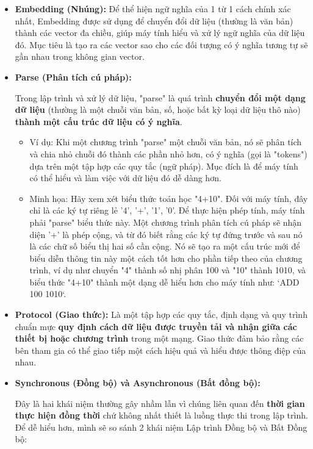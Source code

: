 \documentclass[11pt]{article}
\begin{document}
\begin{itemize}
	\item \textbf{Embedding (Nhúng):} \label{app:embedding} Để thể hiện ngữ nghĩa của 1 từ 1 cách chính xác nhất, Embedding được sử dụng để chuyển đổi dữ liệu (thường là văn bản) thành các vector đa chiều, giúp máy tính hiểu và xử lý ngữ nghĩa của dữ liệu đó. Mục tiêu là tạo ra các vector sao cho các đối tượng có ý nghĩa tương tự sẽ gần nhau trong không gian vector.

    \item \textbf{Parse (Phân tích cú pháp):} \label{app:parse}
    \begin{boxC}
        Trong lập trình và xử lý dữ liệu, "parse" là quá trình \textbf{chuyển đổi một dạng dữ liệu} (thường là một chuỗi văn bản, số, hoặc bất kỳ loại dữ liệu thô nào) \textbf{thành một cấu trúc dữ liệu có ý nghĩa}.
        \begin{itemize}
            \item Ví dụ: Khi một chương trình "parse" một chuỗi văn bản, nó sẽ phân tích và chia nhỏ chuỗi đó thành các phần nhỏ hơn, có ý nghĩa (gọi là "tokens") dựa trên một tập hợp các quy tắc (ngữ pháp). Mục đích là để máy tính có thể hiểu và làm việc với dữ liệu đó dễ dàng hơn.
            \item Minh họa: Hãy xem xét biểu thức toán học "4+10". Đối với máy tính, đây chỉ là các ký tự riêng lẻ '4', '+', '1', '0'. Để thực hiện phép tính, máy tính phải "parse" biểu thức này. Một chương trình phân tích cú pháp sẽ nhận diện '+' là phép cộng, và từ đó biết rằng các ký tự đứng trước và sau nó là các chữ số biểu thị hai số cần cộng. Nó sẽ tạo ra một cấu trúc mới để biểu diễn thông tin này một cách tốt hơn cho phần tiếp theo của chương trình, ví dụ như chuyển "4" thành số nhị phân 100 và "10" thành 1010, và biểu thức "4+10" thành một dạng dễ hiểu hơn cho máy tính như: `ADD 100 1010`.
        \end{itemize}
    \end{boxC}

    \item \textbf{Protocol (Giao thức):} \label{app:protocol} Là một tập hợp các quy tắc, định dạng và quy trình chuẩn mực \textbf{quy định cách dữ liệu được truyền tải và nhận giữa các thiết bị hoặc chương trình} trong một mạng. Giao thức đảm bảo rằng các bên tham gia có thể giao tiếp một cách hiệu quả và hiểu được thông điệp của nhau.

    \item \textbf{Synchronous (Đồng bộ) và Asynchronous (Bất đồng bộ):} \label{app:synchronous_asynchronous}
    \begin{boxC}
        Đây là hai khái niệm thường gây nhầm lẫn vì chúng liên quan đến \textbf{thời gian thực hiện đồng thời} chứ không nhất thiết là luồng thực thi trong lập trình. Để dễ hiểu hơn, mình sẽ so sánh 2 khái niệm Lập trình Đồng bộ và Bất Đồng bộ:


\end{boxC}
\end{itemize}
\end{document}
